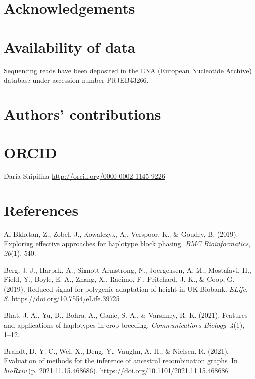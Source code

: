 \documentclass[twocolumn]{bmcart}%
\begin{document}

\begin{backmatter}

\section*{Acknowledgements}%


\section*{Availability of data}%
Sequencing reads have been deposited in the ENA (European Nucleotide Archive) database under accession number PRJEB43266.

\section*{Authors' contributions}


\section*{ORCID}
Daria Shipilina \url{http://orcid.org/0000-0002-1145-9226} \\


\section*{References}

Al Bkhetan, Z., Zobel, J., Kowalczyk, A., Verspoor, K., \& Goudey, B.
(2019). Exploring effective approaches for haplotype block phasing.
\emph{BMC Bioinformatics}, \emph{20}(1), 540.

Berg, J. J., Harpak, A., Sinnott-Armstrong, N., Joergensen, A. M.,
Mostafavi, H., Field, Y., Boyle, E. A., Zhang, X., Racimo, F.,
Pritchard, J. K., \& Coop, G. (2019). Reduced signal for polygenic
adaptation of height in UK Biobank. \emph{ELife}, \emph{8}.
https://doi.org/10.7554/eLife.39725

Bhat, J. A., Yu, D., Bohra, A., Ganie, S. A., \& Varshney, R. K. (2021).
Features and applications of haplotypes in crop breeding.
\emph{Communications Biology}, \emph{4}(1), 1--12.

Brandt, D. Y. C., Wei, X., Deng, Y., Vaughn, A. H., \& Nielsen, R.
(2021). Evaluation of methods for the inference of ancestral
recombination graphs. In \emph{bioRxiv} (p. 2021.11.15.468686).
https://doi.org/10.1101/2021.11.15.468686


\end{backmatter}
\end{document}
